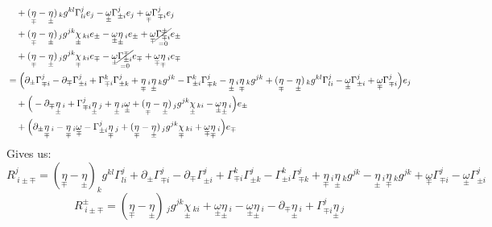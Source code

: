 \documentclass[a4paper,11pt]{article}
\numberwithin{equation}{section}
\theoremstyle{definition}
\begin{document}
\begin{align*}
    &\quad + (\underset{\mp}{\eta}-\underset{\pm}{\eta})\,_kg^{kl}\Gamma_{li}^j e_j
    - \underset{\pm}{\omega} \Gamma_{\pm i}^j e_j
    + \underset{\mp}{\omega} \Gamma_{\mp i}^j e_j\\
    &\quad + (\underset{\mp}{\eta}-\underset{\pm}{\eta})\,_jg^{jk}\underset{\pm}{\chi}\,_{ki} e_\pm
    - \underset{\pm}{\omega} \underset{\pm}{\eta}\,_i e_\pm
    + \underset{\mp}{\omega} \underset{=0}{\cancel{\Gamma_{\mp i}^\pm}} e_\pm\\
    &\quad + (\underset{\mp}{\eta}-\underset{\pm}{\eta})\,_jg^{jk}\underset{\mp}{\chi}\,_{ki} e_\mp
    - \underset{\pm}{\omega} \underset{=0}{\cancel{\Gamma_{\pm i}^\mp}} e_\mp
    + \underset{\mp}{\omega} \underset{\mp}{\eta}\,_i e_\mp\\
    &=\Big(\partial_\pm\Gamma_{\mp i}^j -\partial_\mp\Gamma_{\pm i}^j + \Gamma_{\mp i}^k\Gamma_{\pm k}^j +\underset{\mp}{\eta}\,_i\underset{\pm}{\eta}\,_kg^{jk} -\Gamma_{\pm i}^k\Gamma_{\mp k}^j -\underset{\pm}{\eta}\,_i\underset{\mp}{\eta}\,_kg^{jk} + (\underset{\mp}{\eta}-\underset{\pm}{\eta})\,_kg^{kl}\Gamma_{li}^j
    - \underset{\pm}{\omega} \Gamma_{\pm i}^j
    + \underset{\mp}{\omega} \Gamma_{\mp i}^j \Big)e_j\\
    &\quad +\Big(-\partial_\mp\underset{\pm}{\eta}\,_i + \Gamma_{\mp i}^j\underset{\pm}{\eta}\,_j +\underset{\pm}{\eta}\,_i\underset{\pm}{\omega} + (\underset{\mp}{\eta}-\underset{\pm}{\eta})\,_jg^{jk}\underset{\pm}{\chi}\,_{ki}
    - \underset{\pm}{\omega} \underset{\pm}{\eta}\,_i \Big)e_\pm\\
    &\quad +\Big(\partial_\pm\underset{\mp}{\eta}\,_i -\underset{\mp}{\eta}\,_i\underset{\mp}{\omega} -\Gamma_{\pm i}^j\underset{\mp}{\eta}\,_j + (\underset{\mp}{\eta}-\underset{\pm}{\eta})\,_jg^{jk}\underset{\mp}{\chi}\,_{ki} + \underset{\mp}{\omega} \underset{\mp}{\eta}\,_i \Big)e_\mp
\end{align*}
Gives us:
\begin{equation}
    \boxed{R^j_{\;i\pm\mp}\!\!=\!
    (\underset{\mp}{\eta}\!-\!\underset{\pm}{\eta})_kg^{kl}\Gamma_{li}^j
    +\!\partial_\pm\Gamma_{\mp i}^j
    \!-\!\partial_\mp\Gamma_{\pm i}^j
    +\!\Gamma_{\mp i}^k\Gamma_{\pm k}^j
    \!-\!\Gamma_{\pm i}^k\Gamma_{\mp k}^j
    +\!\underset{\mp}{\eta}\,_i\underset{\pm}{\eta}\,_kg^{jk}
    \!-\!\underset{\pm}{\eta}\,_i\underset{\mp}{\eta}\,_kg^{jk}
    +\!\underset{\mp}{\omega} \Gamma_{\mp i}^j
    \!-\!\underset{\pm}{\omega} \Gamma_{\pm i}^j }
\end{equation}
\begin{equation}
    \boxed{R^\pm_{\;i\pm\mp} =
    (\underset{\mp}{\eta}-\underset{\pm}{\eta})\,_jg^{jk}\underset{\pm}{\chi}\,_{ki}
    +\underset{\pm}{\omega}\underset{\pm}{\eta}\,_i 
    - \underset{\pm}{\omega} \underset{\pm}{\eta}\,_i
    -\partial_\mp\underset{\pm}{\eta}\,_i
    + \Gamma_{\mp i}^j\underset{\pm}{\eta}\,_j}
\end{equation}
\end{document}

